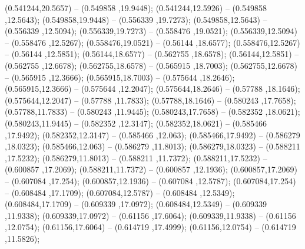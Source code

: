  (0.541244,20.5657) -- (0.549858 ,19.9448);
 (0.541244,12.5926) -- (0.549858 ,12.5643);
 (0.549858,19.9448) -- (0.556339 ,19.7273);
 (0.549858,12.5643) -- (0.556339 ,12.5094);
 (0.556339,19.7273) -- (0.558476 ,19.0521);
 (0.556339,12.5094) -- (0.558476 ,12.5267);
 (0.558476,19.0521) -- (0.56144 ,18.6577);
 (0.558476,12.5267) -- (0.56144 ,12.5851);
 (0.56144,18.6577) -- (0.562755 ,18.6578);
 (0.56144,12.5851) -- (0.562755 ,12.6678);
 (0.562755,18.6578) -- (0.565915 ,18.7003);
 (0.562755,12.6678) -- (0.565915 ,12.3666);
 (0.565915,18.7003) -- (0.575644 ,18.2646);
 (0.565915,12.3666) -- (0.575644 ,12.2047);
 (0.575644,18.2646) -- (0.57788 ,18.1646);
 (0.575644,12.2047) -- (0.57788 ,11.7833);
 (0.57788,18.1646) -- (0.580243 ,17.7658);
 (0.57788,11.7833) -- (0.580243 ,11.9445);
 (0.580243,17.7658) -- (0.582352 ,18.0621);
 (0.580243,11.9445) -- (0.582352 ,12.3147);
 (0.582352,18.0621) -- (0.585466 ,17.9492);
 (0.582352,12.3147) -- (0.585466 ,12.063);
 (0.585466,17.9492) -- (0.586279 ,18.0323);
 (0.585466,12.063) -- (0.586279 ,11.8013);
 (0.586279,18.0323) -- (0.588211 ,17.5232);
 (0.586279,11.8013) -- (0.588211 ,11.7372);
 (0.588211,17.5232) -- (0.600857 ,17.2069);
 (0.588211,11.7372) -- (0.600857 ,12.1936);
 (0.600857,17.2069) -- (0.607084 ,17.254);
 (0.600857,12.1936) -- (0.607084 ,12.5787);
 (0.607084,17.254) -- (0.608484 ,17.1709);
 (0.607084,12.5787) -- (0.608484 ,12.5349);
 (0.608484,17.1709) -- (0.609339 ,17.0972);
 (0.608484,12.5349) -- (0.609339 ,11.9338);
 (0.609339,17.0972) -- (0.61156 ,17.6064);
 (0.609339,11.9338) -- (0.61156 ,12.0754);
 (0.61156,17.6064) -- (0.614719 ,17.4999);
 (0.61156,12.0754) -- (0.614719 ,11.5826);
